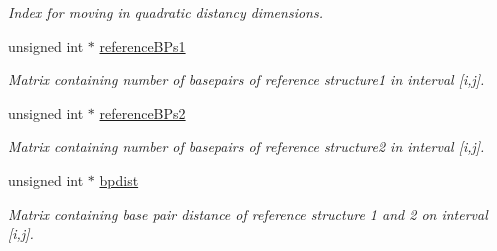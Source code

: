 \begin{DoxyCompactItemize}
\begin{DoxyCompactList}\small\item\em Index for moving in quadratic distancy dimensions. \end{DoxyCompactList}\item 
\hypertarget{group__kl__neighborhood__mfe_a536525b98c1b633d4c5f2da4f8d78c18}{unsigned int $\ast$ \hyperlink{group__kl__neighborhood__mfe_a536525b98c1b633d4c5f2da4f8d78c18}{reference\+B\+Ps1}}\label{group__kl__neighborhood__mfe_a536525b98c1b633d4c5f2da4f8d78c18}

\begin{DoxyCompactList}\small\item\em Matrix containing number of basepairs of reference structure1 in interval \mbox{[}i,j\mbox{]}. \end{DoxyCompactList}\item 
\hypertarget{group__kl__neighborhood__mfe_aa7abf73c3114cb5f0dc90e702fa9dd0f}{unsigned int $\ast$ \hyperlink{group__kl__neighborhood__mfe_aa7abf73c3114cb5f0dc90e702fa9dd0f}{reference\+B\+Ps2}}\label{group__kl__neighborhood__mfe_aa7abf73c3114cb5f0dc90e702fa9dd0f}

\begin{DoxyCompactList}\small\item\em Matrix containing number of basepairs of reference structure2 in interval \mbox{[}i,j\mbox{]}. \end{DoxyCompactList}\item 
\hypertarget{group__kl__neighborhood__mfe_af1106e1a592e2dccc92b3452340549e0}{unsigned int $\ast$ \hyperlink{group__kl__neighborhood__mfe_af1106e1a592e2dccc92b3452340549e0}{bpdist}}\label{group__kl__neighborhood__mfe_af1106e1a592e2dccc92b3452340549e0}

\begin{DoxyCompactList}\small\item\em Matrix containing base pair distance of reference structure 1 and 2 on interval \mbox{[}i,j\mbox{]}. \end{DoxyCompactList}\end{DoxyCompactItemize}


